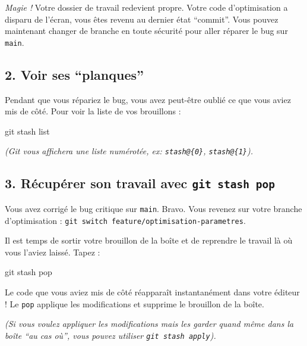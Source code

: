 \documentclass[
  letterpaper,
  DIV=11,
  numbers=noendperiod]{scrreprt}
\newenvironment{Shaded}{\begin{snugshade}}{\end{snugshade}}
\newcommand{\FunctionTok}[1]{\textcolor[rgb]{0.28,0.35,0.67}{#1}}
\newcommand{\NormalTok}[1]{\textcolor[rgb]{0.00,0.23,0.31}{#1}}
\begin{document}
\emph{Magie !} Votre dossier de travail redevient propre. Votre code
d'optimisation a disparu de l'écran, vous êtes revenu au dernier état
``commit''. Vous pouvez maintenant changer de branche en toute sécurité
pour aller réparer le bug sur \texttt{main}.

\subsection{2. Voir ses ``planques''}\label{voir-ses-planques}

Pendant que vous répariez le bug, vous avez peut-être oublié ce que vous
aviez mis de côté. Pour voir la liste de vos brouillons :

\begin{Shaded}
\begin{Highlighting}[]
\FunctionTok{git}\NormalTok{ stash list}
\end{Highlighting}
\end{Shaded}

\emph{(Git vous affichera une liste numérotée, ex: \texttt{stash@\{0\}},
\texttt{stash@\{1\}}).}

\subsection{\texorpdfstring{3. Récupérer son travail avec
\texttt{git\ stash\ pop}}{3. Récupérer son travail avec git stash pop}}\label{ruxe9cupuxe9rer-son-travail-avec-git-stash-pop}

Vous avez corrigé le bug critique sur \texttt{main}. Bravo. Vous revenez
sur votre branche d'optimisation :
\texttt{git\ switch\ feature/optimisation-parametres}.

Il est temps de sortir votre brouillon de la boîte et de reprendre le
travail là où vous l'aviez laissé. Tapez :

\begin{Shaded}
\begin{Highlighting}[]
\FunctionTok{git}\NormalTok{ stash pop}
\end{Highlighting}
\end{Shaded}

Le code que vous aviez mis de côté réapparaît instantanément dans votre
éditeur ! Le \texttt{pop} applique les modifications et supprime le
brouillon de la boîte.

\emph{(Si vous voulez appliquer les modifications mais les garder quand
même dans la boîte ``au cas où'', vous pouvez utiliser
\texttt{git\ stash\ apply}).}
\end{document}
